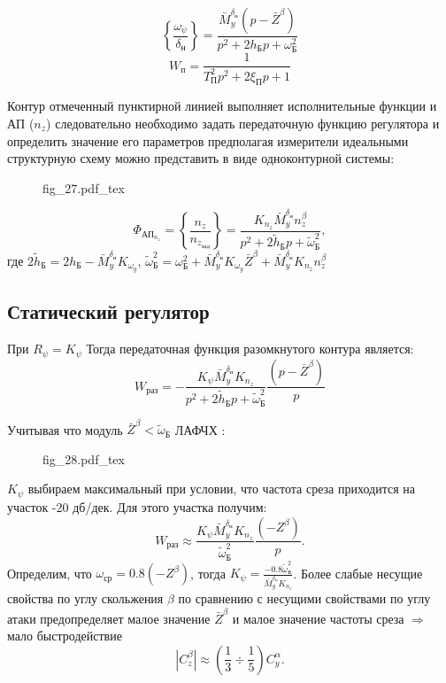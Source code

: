 \documentclass{article}
\begin{document}
\[
    \left\{\frac{\omega_{\psi}}{\delta_\text{н}}\right\}
    =\frac{\bar{M}_y^{\delta_\text{н}}(p - \bar{Z}^\beta)}{p^2 + 2h_\text{Б} p
    + \omega_\text{Б}^2}
\]
\[
    W_\text{п} = \frac{1}{T_\text{П}^2 p^2 + 2\xi_\text{П} p + 1}
\]

Контур отмеченный пунктирной линией выполняет исполнительные функции и АП
($n_z$) следовательно необходимо задать передаточную функцию регулятора и
определить значение его параметров предполагая измерители идеальными
структурную схему можно представить в виде одноконтурной системы:

\begin{figure}[H]
    \centering
    {fig_27.pdf_tex}
\end{figure}


\[
    \Phi_{\text{АП}_{n_z}} = \left\{\frac{n_z}{n_{z_\text{зад}}} \right\}
    =\frac{K_{n_z}\bar{M}_y^{\delta_\text{н}} n_z^\beta}{p^2 + 2
    \tilde{h}_\text{Б} p + \tilde{\omega}_\text{Б}^2},
\]
где $2\tilde{h}_\text{Б} = 2h_\text{Б} -\bar{M}_y^{\delta_\text{н}}
K_{{\omega}_y}$, $\tilde{\omega}_\text{Б}^2 = \omega_\text{Б}^2
+\bar{M}_y^{\delta_\text{н}}K_{\omega_y}\bar{Z}^\beta +
\bar{M}_y^{\delta_\text{н}} K_{n_z}n_z^\beta$

\subsection{Статический регулятор}
При $R_\psi = K_\psi$
Тогда передаточная функция разомкнутого контура является:
\[
    W_\text{раз} = -\frac{K_{\psi} \bar{M}_y^{\delta_\text{н}} K_{n_z}}{p^2 + 2
    \tilde{h}_\text{Б} p + \tilde{\omega}_\text{Б}^2} \frac{(p -
\bar{Z}^\beta)}{p}
\]

Учитывая что модуль $\bar{Z}^\beta < \tilde{\omega}_\text{Б}$
ЛАФЧХ :
\begin{figure}[H]
    \centering
    {fig_28.pdf_tex}
\end{figure}

$K_{\psi}$ выбираем максимальный при условии, что частота среза приходится на
участок -20 дб/дек. Для этого участка получим:
\[
    W_\text{раз} \approx \frac{K_{\psi}\bar{M}_y^{\delta_\text{н}}
    K_{n_z}}{\tilde{\omega}_\text{Б}^2}\frac{(-Z^\beta)}{p}.
\]
Определим, что $\omega_\text{ср} = 0.8(-Z^\beta)$, тогда $K_{\psi}=\frac{-0.8
\tilde{\omega}_\text{Б}^2}{\bar{M}_y^{\delta_\text{н}} K_{n_z}}$.
Более слабые несущие свойства по углу скольжения $\beta$ по сравнению с
несущими свойствами по углу атаки предопределяет малое значение $\bar{Z}^\beta$
и малое значение частоты среза $\Rightarrow$ мало быстродействие
\[
    |C_z^\beta| \approx (\frac{1}{3} \div\frac{1}{5}) C_y^\alpha.
\]
\end{document}
